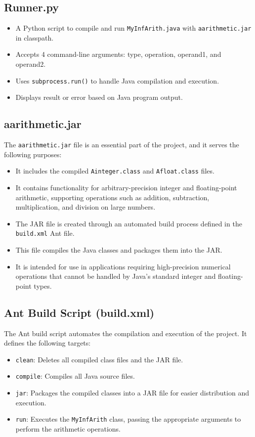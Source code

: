 \documentclass[12pt]{article}
\begin{document}
\subsection{Runner.py}
\begin{itemize}
    \item A Python script to compile and run \texttt{MyInfArith.java} with \texttt{aarithmetic.jar} in classpath.
    \item Accepts 4 command-line arguments: type, operation, operand1, and operand2.
    \item Uses \texttt{subprocess.run()} to handle Java compilation and execution.
    \item Displays result or error based on Java program output.
\end{itemize}

\subsection{aarithmetic.jar}

The \texttt{aarithmetic.jar} file is an essential part of the project, and it serves the following purposes:
\begin{itemize}
    \item It includes the compiled \texttt{Ainteger.class} and \texttt{Afloat.class} files.
    \item It contains functionality for arbitrary-precision integer and floating-point arithmetic, 
          supporting operations such as addition, subtraction, multiplication, and division on large numbers.
    \item The JAR file is created through an automated build process defined in the \texttt{build.xml} Ant file. 
    \item This file compiles the Java classes and packages them into the JAR.
    \item It is intended for use in applications requiring high-precision numerical operations 
          that cannot be handled by Java's standard integer and floating-point types.
\end{itemize}



\subsection{Ant Build Script (build.xml)}
The Ant build script automates the compilation and execution of the project. It defines the following targets:
\begin{itemize}
    \item \texttt{clean}: Deletes all compiled class files and the JAR file.
    \item \texttt{compile}: Compiles all Java source files.
    \item \texttt{jar}: Packages the compiled classes into a JAR file for easier distribution and execution.
    \item \texttt{run}: Executes the \texttt{MyInfArith} class, passing the appropriate arguments to perform the arithmetic operations.
\end{itemize}
\end{document}
